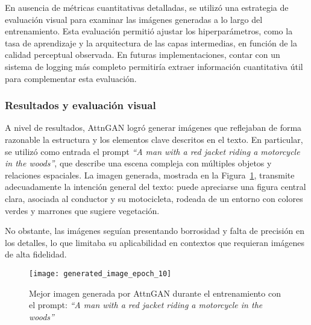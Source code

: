 En ausencia de métricas cuantitativas detalladas, se utilizó una estrategia de evaluación visual para examinar las imágenes generadas a lo largo del entrenamiento. Esta evaluación permitió ajustar los hiperparámetros, como la tasa de aprendizaje y la arquitectura de las capas intermedias, en función de la calidad perceptual observada. En futuras implementaciones, contar con un sistema de logging más completo permitiría extraer información cuantitativa útil para complementar esta evaluación.

\subsubsection{Resultados y evaluación visual}

A nivel de resultados, AttnGAN logró generar imágenes que reflejaban de forma razonable la estructura y los elementos clave descritos en el texto. En particular, se utilizó como entrada el prompt \textit{``A man with a red jacket riding a motorcycle in the woods''}, que describe una escena compleja con múltiples objetos y relaciones espaciales. La imagen generada, mostrada en la Figura~\ref{fig:attn}, transmite adecuadamente la intención general del texto: puede apreciarse una figura central clara, asociada al conductor y su motocicleta, rodeada de un entorno con colores verdes y marrones que sugiere vegetación.

No obstante, las imágenes seguían presentando borrosidad y falta de precisión en los detalles, lo que limitaba su aplicabilidad en contextos que requieran imágenes de alta fidelidad.

\begin{figure}[H]
\centering
\texttt{[image: generated\_image\_epoch\_10]}
\caption{Mejor imagen generada por AttnGAN durante el entrenamiento con el prompt: \textit{``A man with a red jacket riding a motorcycle in the woods''}}
\label{fig:attn}
\end{figure}
